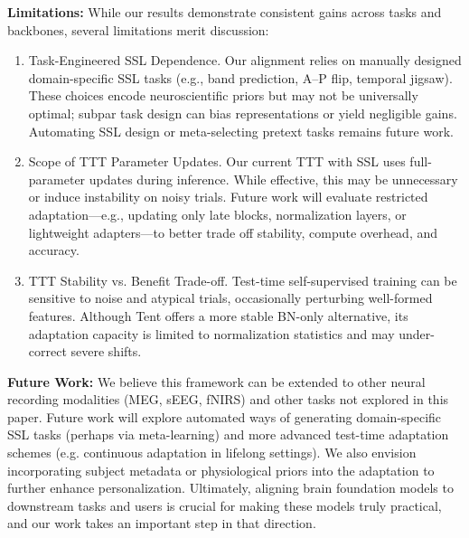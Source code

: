 \textbf{Limitations:} 
While our results demonstrate consistent gains across tasks and backbones, several limitations merit discussion:
\begin{enumerate}
    \item Task-Engineered SSL Dependence. Our alignment relies on manually designed domain-specific SSL tasks (e.g., band prediction, A–P flip, temporal jigsaw). These choices encode neuroscientific priors but may not be universally optimal; subpar task design can bias representations or yield negligible gains. Automating SSL design or meta-selecting pretext tasks remains future work.
    \item Scope of TTT Parameter Updates. Our current TTT with SSL uses full-parameter updates during inference. While effective, this may be unnecessary or induce instability on noisy trials. Future work will evaluate restricted adaptation—e.g., updating only late blocks, normalization layers, or lightweight adapters—to better trade off stability, compute overhead, and accuracy.
    \item TTT Stability vs. Benefit Trade-off. Test-time self-supervised training can be sensitive to noise and atypical trials, occasionally perturbing well-formed features. Although Tent offers a more stable BN-only alternative, its adaptation capacity is limited to normalization statistics and may under-correct severe shifts.
\end{enumerate}

\textbf{Future Work:} We believe this framework can be extended to other neural recording modalities (MEG, sEEG, fNIRS) and other tasks not explored in this paper. Future work will explore automated ways of generating domain-specific SSL tasks (perhaps via meta-learning) and more advanced test-time adaptation schemes (e.g. continuous adaptation in lifelong settings). We also envision incorporating subject metadata or physiological priors into the adaptation to further enhance personalization. Ultimately, aligning brain foundation models to downstream tasks and users is crucial for making these models truly practical, and our work takes an important step in that direction.